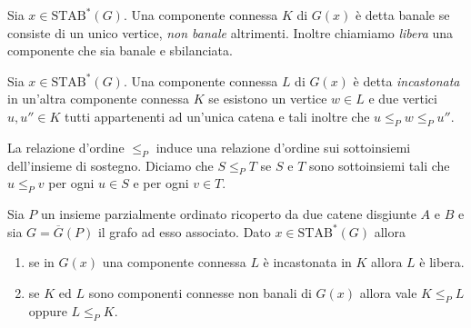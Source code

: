 \begin{definition}
	Sia \(x\in\text{STAB}^*(G)\). Una componente connessa \(K\) di \(G(x)\) è detta banale se consiste di un unico vertice, \emph{non banale} altrimenti. Inoltre chiamiamo \emph{libera} una componente che sia banale e sbilanciata. 
\end{definition}
\begin{definition}
	Sia \(x\in\text{STAB}^{*}(G)\). Una componente connessa \(L\) di \(G(x)\) è detta \emph{incastonata} in un'altra componente connessa \(K\) se esistono un vertice \(w\in L\) e due vertici \(u,u''\in K\) tutti appartenenti ad un'unica catena e tali inoltre che \(u\le_{P}w\le_{P}u''\). 
\end{definition}
La relazione d'ordine \(\le_{P}\) induce una relazione d'ordine sui sottoinsiemi dell'insieme di sostegno. Diciamo che \(S\le_{P}T\) se \(S\) e \(T\) sono sottoinsiemi tali che \(u\le_{P}v\) per ogni \(u\in S\) e per ogni \(v\in T\). 
\begin{lemma}
	\label{inlaylemma} Sia \(P\) un insieme parzialmente ordinato ricoperto da due catene disgiunte \(A\) e \(B\) e sia \(G=\overline{G}(P)\) il grafo ad esso associato. Dato \(x\in\text{STAB}^{*}(G)\) allora 
	\begin{enumerate}
		\item se in \(G(x)\) una componente connessa \(L\) è incastonata in \(K\) allora \(L\) è libera. 
		\item se \(K\) ed \(L\) sono componenti connesse non banali di \(G(x)\) allora vale \(K\le_{P}L\) oppure \(L\le_{P}K\). 
	\end{enumerate}
\end{lemma}
